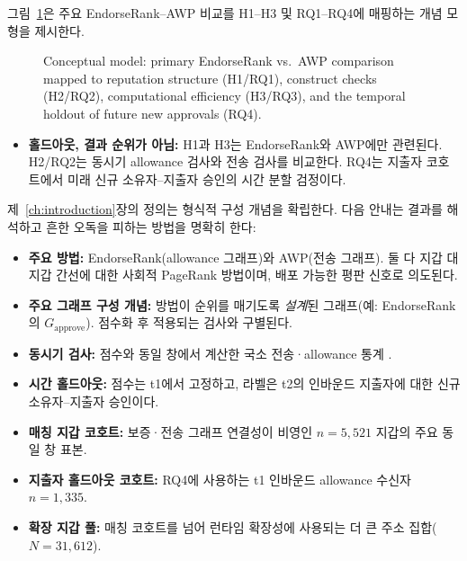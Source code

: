 그림~\ref{fig:conceptual-model}은 주요 EndorseRank--AWP 비교를 H1--H3 및 RQ1--RQ4에 매핑하는 개념 모형을 제시한다.

\begin{figure}[htbp]
\centering

\caption{Conceptual model: primary EndorseRank vs.\ AWP comparison mapped to reputation structure (H1/RQ1), construct checks (H2/RQ2), computational efficiency (H3/RQ3), and the temporal holdout of future new approvals (RQ4).}
\label{fig:conceptual-model}
\end{figure}

\begin{itemize}
\item \textbf{홀드아웃, 결과 순위가 아님:} H1과 H3는 EndorseRank와 AWP에만 관련된다. H2/RQ2는 동시기 allowance 검사와 전송 검사를 비교한다. RQ4는 지출자 코호트에서 미래 신규 소유자--지출자 승인의 시간 분할 검정이다.
\end{itemize}


제~\ref{ch:introduction}장의 정의는 형식적 구성 개념을 확립한다. 다음 안내는 결과를 해석하고 흔한 오독을 피하는 방법을 명확히 한다:

\begin{itemize}
\item \textbf{주요 방법:} EndorseRank(allowance 그래프)와 AWP(전송 그래프). 둘 다 지갑 대 지갑 간선에 대한 사회적 PageRank 방법이며, 배포 가능한 평판 신호로 의도된다.
\item \textbf{주요 그래프 구성 개념:} 방법이 순위를 매기도록 \emph{설계}된 그래프(예: EndorseRank의 $G_{\text{approve}}$). 점수화 후 적용되는 검사와 구별된다.
\item \textbf{동시기 검사:} 점수와 동일 창에서 계산한 국소 전송·allowance 통계 .
\item \textbf{시간 홀드아웃:} 점수는 t1에서 고정하고, 라벨은 t2의 인바운드 지출자에 대한 신규 소유자--지출자 승인이다.
\item \textbf{매칭 지갑 코호트:} 보증·전송 그래프 연결성이 비영인 $n=5{,}521$ 지갑의 주요 동일 창 표본.
\item \textbf{지출자 홀드아웃 코호트:} RQ4에 사용하는 t1 인바운드 allowance 수신자 $n=1{,}335$.
\item \textbf{확장 지갑 풀:} 매칭 코호트를 넘어 런타임 확장성에 사용되는 더 큰 주소 집합($N=31{,}612$).
\end{itemize}



